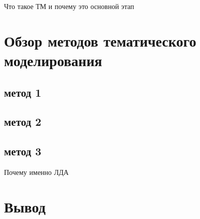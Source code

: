 Что такое ТМ и почему это основной этап

\section{Обзор методов тематического моделирования}
\label{sec:tm_techniques}

\subsection{метод 1}
\subsection{метод 2}
\subsection{метод 3}

Почему именно ЛДА

\section{Вывод}
\label{sec:overview_concl}

\blindtext
